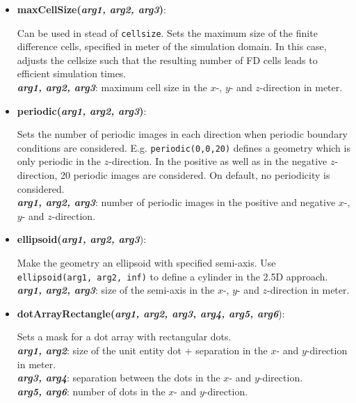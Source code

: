 \begin{itemize}

 \item {\textbf{maxCellSize(\textit{arg1, arg2, arg3})}:
				\flushright\parbox{0.9 \textwidth}{\vspace{-0.25cm} 
				Can be used in stead of \texttt{cellsize}.  Sets the maximum size of the finite difference cells, specified in meter of the simulation domain.  In this case, \mumax adjusts the cellsize such that the resulting number of FD cells leads to efficient simulation times.\\
				\textbf{\textit{arg1, arg2, arg3}}: maximum cell size in the $x$-, $y$- and $z$-direction in meter.
				}\flushleft}

 \item {\vspace{-0.4cm}\textbf{periodic(\textit{arg1, arg2, arg3})}:
				\flushright\parbox{0.9 \textwidth}{\vspace{-0.25cm} 
				Sets the number of periodic images in each direction when periodic boundary conditions are considered.  E.g. \texttt{periodic(0,0,20)} defines a geometry which is only periodic in the $z$-direction.  In the positive as well as in the negative $z$-direction, 20 periodic images are considered. On default, no periodicity is considered.\\
				\textbf{\textit{arg1, arg2, arg3}}: number of periodic images in the positive and negative $x$-, $y$- and $z$-direction.
				}\flushleft}

 \item {\vspace{-0.4cm}\textbf{ellipsoid(\textit{arg1, arg2, arg3}}):
				\flushright\parbox{0.9 \textwidth}{\vspace{-0.25cm} 
				Make the geometry an ellipsoid with specified semi-axis.  Use \texttt{ellipsoid(arg1, arg2, inf)} to define a cylinder in the 2.5D approach.\\
				\textbf{\textit{arg1, arg2, arg3}}: size of the semi-axis in the $x$-, $y$- and $z$-direction in meter.
				}\flushleft}

 \item {\vspace{-0.4cm}\textbf{dotArrayRectangle(\textit{arg1, arg2, arg3, arg4, arg5, arg6}}):
				\flushright\parbox{0.9 \textwidth}{\vspace{-0.25cm} 
				Sets a mask for a dot array with rectangular dots.\\
				\textbf{\textit{arg1, arg2}}: size of the unit entity dot + separation in the $x$- and $y$-direction in meter.\\
				\textbf{\textit{arg3, arg4}}: separation between the dots in the $x$- and $y$-direction.\\
				\textbf{\textit{arg5, arg6}}: number of dots in the $x$- and $y$-direction.
				}\flushleft}


\end{itemize}
